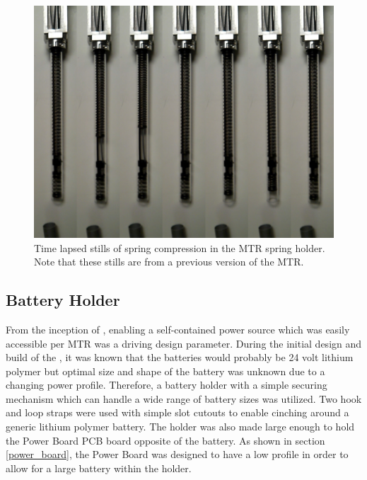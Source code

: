 \begin{figure}[thpb]%
      \centering
      \includegraphics[width=0.8\columnwidth]{tex/img/double_spring_series}
      \caption{Time lapsed stills of spring compression in the MTR spring holder. Note that these stills are from a previous version of the MTR.}
      \label{fig:spring_holder}
\end{figure}

\subsection{Battery Holder}
\label{battery_holder}
From the inception of \SB{}, enabling a self-contained power source which was easily accessible per MTR was a driving design parameter.
During the initial design and build of the \SB{}, it was known that the batteries would probably be 24 volt lithium polymer but optimal size and shape of the battery was unknown due to a changing power profile.
Therefore, a battery holder with a simple securing mechanism which can handle a wide range of battery sizes was utilized.
Two hook and loop straps were used with simple slot cutouts to enable cinching around a generic lithium polymer battery.
The holder was also made large enough to hold the Power Board PCB board opposite of the battery.
As shown in section \ref{power_board}, the Power Board was designed to have a low profile in order to allow for a large battery within the holder.

